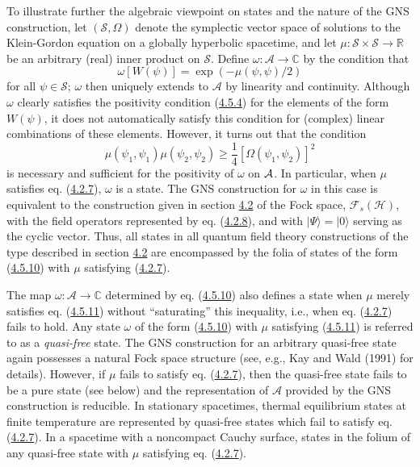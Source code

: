 \documentclass[11pt,a4paper]{article}
\begin{document}
To illustrate further the algebraic viewpoint on states and the nature of the GNS construction, let \((\mathcal S,\Omega)\) denote the symplectic vector space of solutions to the Klein-Gordon equation on a globally hyperbolic spacetime, and let \(\mu:\mathcal S\times\mathcal S\to\mathbb R\) be an arbitrary (real) inner \hypertarget{source-90}{} product on \(\mathcal{S}\). Define \(\omega: \mathcal{A} \to \mathbb{C}\) by the condition that
\begin{equation*}
\omega[W(\psi)] = \exp(-\mu(\psi,\psi)/2) \tag{4.5.10}\label{eq:4.5.10}
\end{equation*}
for all \(\psi\in\mathcal S\); \(\omega\) then uniquely extends to \(\mathcal{A}\) by linearity and continuity. Although \(\omega\) clearly satisfies the positivity condition (\hyperref[eq:4.5.4]{4.5.4}) for the elements of the form \(W(\psi)\), it does not automatically satisfy this condition for (complex) linear combinations of these elements. However, it turns out that the condition
\begin{equation*}
\mu(\psi_1,\psi_1) \mu(\psi_2,\psi_2) \ge \frac{1}{4} [\Omega(\psi_1,\psi_2)]^2 \tag{4.5.11}\label{eq:4.5.11}
\end{equation*}
is necessary and sufficient for the positivity of \(\omega\) on \({\cal A}\). In particular, when \(\mu\) satisfies eq. (\hyperref[eq:4.2.7]{4.2.7}), \(\omega\) is a state. The GNS construction for \(\omega\) in this case is equivalent to the construction given in section \hyperlink{sec:4.2}{4.2} of the Fock space, \({\mathcal{F}}_s({\mathcal{H}})\), with the field operators represented by eq. (\hyperref[eq:4.2.8]{4.2.8}), and with \(\lvert \Psi\rangle=\lvert 0\rangle\) serving as the cyclic vector. Thus, all states in all quantum field theory constructions of the type described in section \hyperlink{sec:4.2}{4.2} are encompassed by the folia of states of the form (\hyperref[eq:4.5.10]{4.5.10}) with \(\mu\) satisfying (\hyperref[eq:4.2.7]{4.2.7}).

The map \(\omega: \mathcal{A} \to \mathbb{C}\) determined by eq. (\hyperref[eq:4.5.10]{4.5.10}) also defines a state when \(\mu\) merely satisfies eq. (\hyperref[eq:4.5.11]{4.5.11}) without ``saturating'' this inequality, i.e., when eq. (\hyperref[eq:4.2.7]{4.2.7}) fails to hold. Any state \(\omega\) of the form (\hyperref[eq:4.5.10]{4.5.10}) with \(\mu\) satisfying (\hyperref[eq:4.5.11]{4.5.11}) is referred to as a \emph{quasi-free} state. The GNS construction for an arbitrary quasi-free state again possesses a natural Fock space structure (see, e.g., Kay and Wald (1991) for details). However, if \(\mu\) fails to satisfy eq. (\hyperref[eq:4.2.7]{4.2.7}), then the quasi-free state fails to be a pure state (see below) and the representation of \(\mathcal A\) provided by the GNS construction is reducible. In stationary spacetimes, thermal equilibrium states at finite temperature are represented by quasi-free states which fail to satisfy eq. (\hyperref[eq:4.2.7]{4.2.7}). In a spacetime with a noncompact Cauchy surface, states in the folium of any quasi-free state with \(\mu\) satisfying eq. (\hyperref[eq:4.2.7]{4.2.7}).
\end{document}
